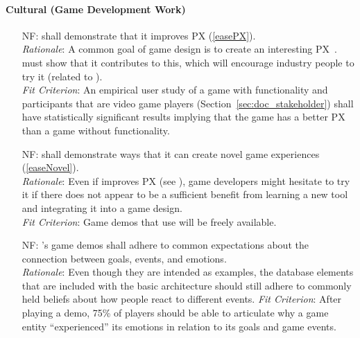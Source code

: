 \paragraph{Cultural (Game Development Work)}
\noindent \begin{itemize}[wide=0pt, leftmargin=*]
    \item[NF\refstepcounter{nfnum}\thenfnum \label{N_PX}:] \progname{} shall
    demonstrate that it improves PX (\ref{easePX}). \vspace*{1mm}\\
    \textit{Rationale}: A common goal of game design is to create an
    interesting PX~\citep[p.~11]{mcallister2015video}. \progname{} must show
    that it contributes to this, which will encourage industry people to try it
    (related to ). \vspace*{1mm}\\
    \textit{Fit Criterion}: An empirical user study of a game with \progname{}
    functionality and participants that are video game players
    (Section~\ref{sec:doc_stakeholder}) shall have statistically significant
    results implying that the game has a better PX than a game without
    \progname{} functionality.

    \item[NF\refstepcounter{nfnum}\thenfnum \label{N_Novel}:] \progname{} shall
    demonstrate ways that it can create novel game experiences
    (\ref{easeNovel}). \vspace*{1mm}\\
    \textit{Rationale}: Even if \progname{} improves PX (see ),
    game developers might hesitate to try it if there does not appear to be a
    sufficient benefit from learning a new tool and integrating it into a game
    design. \vspace*{1mm}\\
    \textit{Fit Criterion}: Game demos that use \progname{} will be freely
    available.

    \item[NF\refstepcounter{nfnum}\thenfnum \label{N_Examples}:] \progname{}'s
    game demos shall adhere to common expectations about the connection between
    goals, events, and emotions. \vspace*{1mm}\\
    \textit{Rationale}: Even though they are intended as examples, the database
    elements that are included with the basic architecture should still adhere
    to commonly held beliefs about how people react to different events.
    \vspace*{1mm}\linebreak
    \textit{Fit Criterion}: After playing a demo, 75\% of players should be
    able to articulate why a game entity ``experienced'' its emotions in
    relation to its goals and game events.

\end{itemize}

